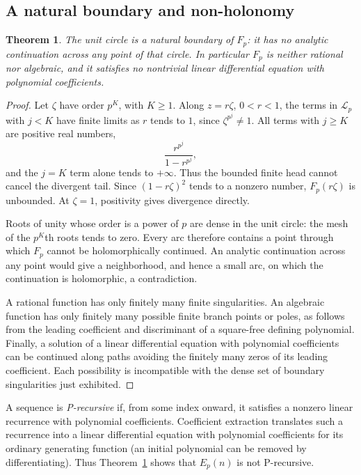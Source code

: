 \documentclass[11pt,a4paper]{article}
\numberwithin{equation}{section}
\newtheorem{theorem}{Theorem}[section]
\theoremstyle{definition}
\theoremstyle{remark}
\begin{document}
\subsection{A natural boundary and non-holonomy}
\begin{theorem}\label{thm:naturalboundary}
The unit circle is a natural boundary of $F_p$: it has no analytic continuation across any point of that circle. In particular $F_p$ is neither rational nor algebraic, and it satisfies no nontrivial linear differential equation with polynomial coefficients.
\end{theorem}
\begin{proof}
Let $\zeta$ have order $p^K$, with $K\geq1$. Along $z=r\zeta$, $0<r<1$, the terms in $\mathcal L_p$ with $j<K$ have finite limits as $r$ tends to $1$, since $\zeta^{p^j}\neq1$. All terms with $j\geq K$ are positive real numbers,
\[
 \frac{r^{p^j}}{1-r^{p^j}},
\]
and the $j=K$ term alone tends to $+\infty$. Thus the bounded finite head cannot cancel the divergent tail. Since $(1-r\zeta)^2$ tends to a nonzero number, $F_p(r\zeta)$ is unbounded. At $\zeta=1$, positivity gives divergence directly.

Roots of unity whose order is a power of $p$ are dense in the unit circle: the mesh of the $p^K$th roots tends to zero. Every arc therefore contains a point through which $F_p$ cannot be holomorphically continued. An analytic continuation across any point would give a neighborhood, and hence a small arc, on which the continuation is holomorphic, a contradiction.

A rational function has only finitely many finite singularities. An algebraic function has only finitely many possible finite branch points or poles, as follows from the leading coefficient and discriminant of a square-free defining polynomial. Finally, a solution of a linear differential equation with polynomial coefficients can be continued along paths avoiding the finitely many zeros of its leading coefficient. Each possibility is incompatible with the dense set of boundary singularities just exhibited.
\end{proof}

A sequence is \emph{P-recursive} if, from some index onward, it satisfies a nonzero linear recurrence with polynomial coefficients. Coefficient extraction translates such a recurrence into a linear differential equation with polynomial coefficients for its ordinary generating function (an initial polynomial can be removed by differentiating). Thus Theorem~\ref{thm:naturalboundary} shows that $E_p(n)$ is not P-recursive.
\end{document}
